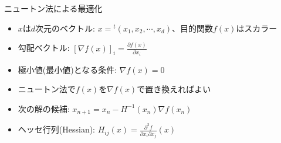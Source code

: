 \begin{frame}[t,fragile]{ニュートン法による最適化}
  \begin{itemize}
    \setlength{\itemsep}{1em}
  \item $x$は$d$次元のベクトル: $x = {}^t(x_1,x_2,\cdots,x_d)$、目的関数$f(x)$はスカラー
  \item 勾配ベクトル: $\displaystyle [\nabla f(x)]_i = \frac{\partial f(x)}{\partial x_i}$
  \item 極小値(最小値)となる条件: $\nabla f(x)=0$
  \item ニュートン法で$f(x)$を$\nabla f(x)$で置き換えればよい
  \item 次の解の候補: $\displaystyle x_{n+1} = x_n - H^{-1}(x_n) \nabla f(x_n)$
  \item ヘッセ行列(Hessian): $\displaystyle H_{ij}(x) = \frac{\partial^2 f}{\partial x_i \partial x_j}(x)$
  \end{itemize}
\end{frame}
